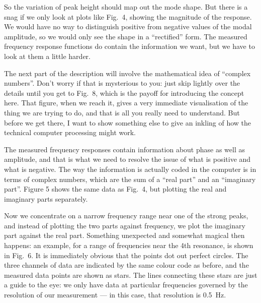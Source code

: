   So the variation of peak height should map out the mode shape. But there is a 
  snag if we only look at plots like Fig.\ 4, showing the magnitude of the 
  response. We would have no way to distinguish positive from negative values 
  of the modal amplitude, so we would only see the shape in a “rectified” form. 
  The measured frequency response functions do contain the information we want, 
  but we have to look at them a little harder. 

  The next part of the description will involve the mathematical idea of 
  “complex numbers”. Don’t worry if that is mysterious to you: just skip 
  lightly over the details until you get to Fig.\ 8, which is the payoff for 
  introducing the concept here. That figure, when we reach it, gives a very 
  immediate visualisation of the thing we are trying to do, and that is all you 
  really need to understand. But before we get there, I want to show something 
  else to give an inkling of how the technical computer processing might work. 

  The measured frequency responses contain information about phase as well as 
  amplitude, and that is what we need to resolve the issue of what is positive 
  and what is negative. The way the information is actually coded in the 
  computer is in terms of complex numbers, which are the sum of a “real part” 
  and an “imaginary part”. Figure 5 shows the same data as Fig.\ 4, but 
  plotting the real and imaginary parts separately. 



  Now we concentrate on a narrow frequency range near one of the strong peaks, 
  and instead of plotting the two parts against frequency, we plot the 
  imaginary part against the real part. Something unexpected and somewhat 
  magical then happens: an example, for a range of frequencies near the 4th 
  resonance, is shown in Fig.\ 6. It is immediately obvious that the points dot 
  out perfect circles. The three channels of data are indicated by the same 
  colour code as before, and the measured data points are shown as stars. The 
  lines connecting these stars are just a guide to the eye: we only have data 
  at particular frequencies governed by the resolution of our measurement — in 
  this case, that resolution is 0.5~Hz. 


